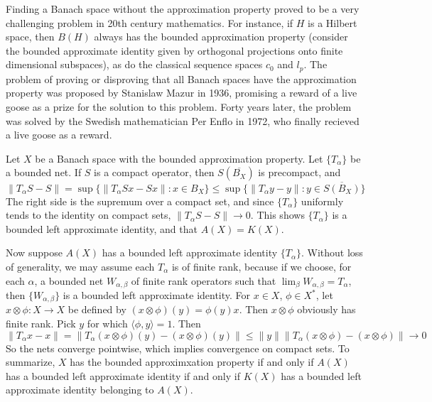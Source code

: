 \begin{example}
    Finding a Banach space without the approximation property proved to be a very challenging problem in 20th century mathematics. For instance, if $H$ is a Hilbert space, then $B(H)$ always has the bounded approximation property (consider the bounded approximate identity given by orthogonal projections onto finite dimensional subspaces), as do the classical sequence spaces $c_0$ and $l_p$. The problem of proving or disproving that all Banach spaces have the approximation property was proposed by Stanislaw Mazur in 1936, promising a reward of a live goose as a prize for the solution to this problem. Forty years later, the problem was solved by the Swedish mathematician Per Enflo in 1972, who finally recieved a live goose as a reward.
\end{example}

\begin{example}
    Let $X$ be a Banach space with the bounded approximation property. Let $\{ T_\alpha \}$ be a bounded net. If $S$ is a compact operator, then $S(\overline{B_X})$ is precompact, and
    \[ \| T_\alpha S - S \| = \sup \{ \| T_\alpha Sx - Sx \| : x \in B_X \} \leq \sup \{ \| T_\alpha y - y \| : y \in \overline{S(B_X)} \} \]
    The right side is the supremum over a compact set, and since $\{ T_\alpha \}$ uniformly tends to the identity on compact sets, $\| T_\alpha S - S \| \to 0$. This shows $\{ T_\alpha \}$ is a bounded left approximate identity, and that $A(X) = K(X)$.

    Now suppose $A(X)$ has a bounded left approximate identity $\{ T_\alpha \}$. Without loss of generality, we may assume each $T_\alpha$ is of finite rank, because if we choose, for each $\alpha$, a bounded net $W_{\alpha, \beta}$ of finite rank operators such that $\lim_\beta W_{\alpha, \beta} = T_\alpha$, then $\{ W_{\alpha, \beta} \}$ is a bounded left approximate identity. For $x \in X$, $\phi \in X^*$, let $x \otimes \phi : X \to X$ be defined by $(x \otimes \phi)(y) = \phi(y) x$. Then $x \otimes \phi$ obviously has finite rank. Pick $y$ for which $\langle \phi, y \rangle = 1$. Then
    \[ \| T_\alpha x - x \| = \| T_\alpha (x \otimes \phi)(y) - (x \otimes \phi)(y) \| \leq \| y \| \| T_\alpha (x \otimes \phi) - (x \otimes \phi) \| \to 0 \]
    So the nets converge pointwise, which implies convergence on compact sets. To summarize, $X$ has the bounded approximxation property if and only if $A(X)$ has a bounded left approximate identity if and only if $K(X)$ has a bounded left approximate identity belonging to $A(X)$.
\end{example}

